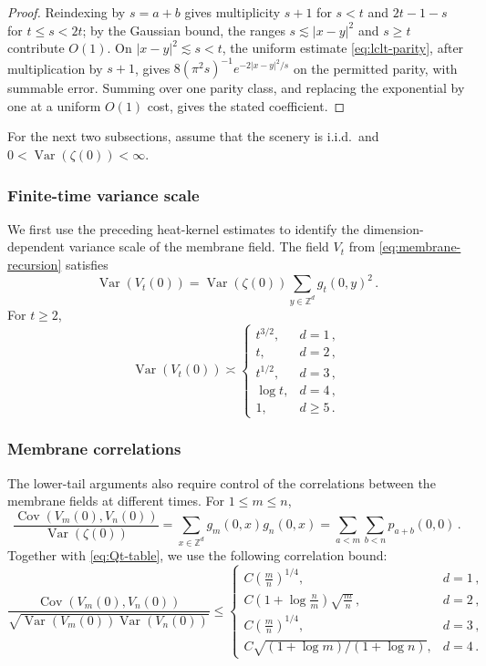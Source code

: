 \documentclass[11pt]{amsart}
\theoremstyle{plain}
\theoremstyle{definition}
\newcommand{\Z}{\mathbb{Z}}
\DeclareMathOperator{\Var}{Var}
\DeclareMathOperator{\Cov}{Cov}
\begin{document}
\begin{proof}
	Reindexing by $s=a+b$ gives multiplicity $s+1$ for $s<t$ and $2t-1-s$ for $t\leq s<2t$; by the Gaussian bound, the ranges $s\lesssim|x-y|^2$ and $s\geq t$ contribute $O(1)$. On $|x-y|^2\lesssim s<t$, the uniform estimate \eqref{eq:lclt-parity}, after multiplication by $s+1$, gives $8(\pi^2s)^{-1}e^{-2|x-y|^2/s}$ on the permitted parity, with summable error. Summing over one parity class, and replacing the exponential by one at a uniform $O(1)$ cost, gives the stated coefficient.
\end{proof}

For the next two subsections, assume that the scenery is i.i.d.\ and
$0<\Var(\zeta(0))<\infty$.

\subsubsection{Finite-time variance scale}

We first use the preceding heat-kernel estimates to identify the dimension-dependent variance scale of the membrane field. The field $V_t$ from \eqref{eq:membrane-recursion} satisfies
		\[
			\Var(V_t(0))
			=
			\Var(\zeta(0))\sum_{y\in\Z^d}g_t(0,y)^2\, .
		\]
		For $t\geq2$,
		\begin{equation}\label{eq:Qt-table}
			\Var(V_t(0))\asymp
			\begin{cases}
			t^{3/2}, & d=1\, ,\\
			t, & d=2\, ,\\
			t^{1/2}, & d=3\, ,\\
			\log t, & d=4\, ,\\
			1, & d\geq5\, .
		\end{cases}
	\end{equation}
	\subsubsection{Membrane correlations}
The lower-tail arguments also require control of the correlations between the membrane fields at different times. For $1\leq m\leq n$,
		\[
			\frac{\Cov(V_m(0),V_n(0))}{\Var(\zeta(0))}
			=
			\sum_{x\in\Z^d}g_m(0,x)g_n(0,x)
			=
			\sum_{a<m}\sum_{b<n}p_{a+b}(0,0)\, .
		\]
		Together with \eqref{eq:Qt-table}, we use the following correlation bound:
		\begin{equation}\label{eq:corr-bound}
			\frac{\Cov(V_m(0),V_n(0))}
			{\sqrt{\Var(V_m(0))\Var(V_n(0))}}
			\leq
			\begin{cases}
				C(\tfrac mn)^{1/4},& d=1\, ,\\[2pt]
				C(1{+}\log\tfrac nm)\sqrt{\tfrac mn}\, ,
				& d=2\, ,\\[2pt]
				C(\tfrac mn)^{1/4},& d=3\, ,\\[2pt]
				C\sqrt{(1+\log m)/(1+\log n)},& d=4\, .
			\end{cases}
		\end{equation}
\end{document}
